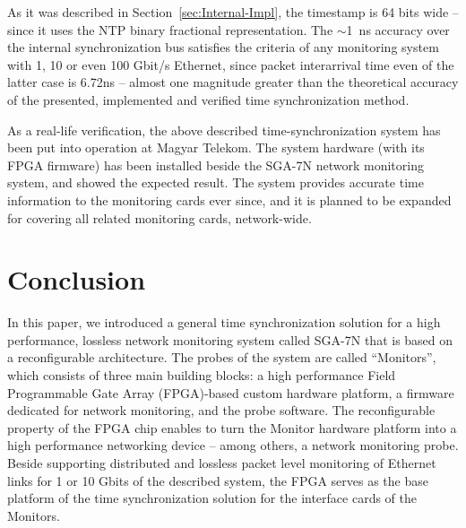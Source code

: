 \documentclass[journal]{IEEEtran}
\begin{document}


As it was described in Section~\ref{sec:Internal-Impl}, the
timestamp is 64 bits wide -- since it uses the NTP binary fractional representation. 
The $\sim$\SI{1}{\nano\second} accuracy over the internal synchronization bus satisfies the criteria of any monitoring system with 1, 10 or even 100 Gbit/s Ethernet, since packet interarrival time even of the latter case is 6.72ns \cite{6ns_interarrival} -- almost one magnitude greater than the theoretical accuracy of the presented, implemented and verified time synchronization method.

As a real-life verification, the above described time-synchronization system has been put into operation at Magyar Telekom. The system hardware (with its FPGA firmware) has been installed beside the SGA-7N network monitoring system, and showed the expected result. The system provides accurate time information to the monitoring cards ever since, and it is planned to be expanded for covering all related monitoring cards, network-wide.

\section{Conclusion}

In this paper, we introduced a general time synchronization solution for a high performance, lossless network monitoring system called SGA-7N that is based on a reconfigurable architecture. The probes of the system are called ``Monitors'', which consists of three main building blocks: a high performance Field Programmable Gate Array (FPGA)-based custom hardware platform, a firmware dedicated for network monitoring, and the probe software. The reconfigurable property of the FPGA chip enables to turn the Monitor hardware platform into a high performance networking device -- among others, a network monitoring probe. Beside supporting distributed and lossless packet level monitoring of Ethernet links for 1 or 10 Gbit\/s of the described system, the FPGA serves as the base platform of the time synchronization solution for the interface cards of the Monitors.
\end{document}
